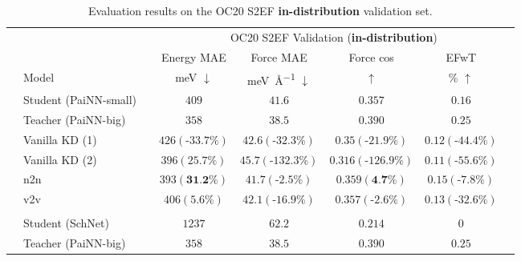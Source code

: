 \documentclass{article}
\begin{document}
\begin{table}[H]
\centering
\caption{Evaluation results on the OC20 S2EF \textbf{in-distribution} validation set.}
\begin{tabular}{llcccccc}
\multicolumn{1}{c}{\multirow{3}{*}{}} & & & \multicolumn{5}{c}{OC20 S2EF Validation (\textbf{in-distribution})} 
\\\cmidrule(r){4-7}
\multicolumn{1}{c}{}   &   &                   &      Energy MAE  &    Force MAE  & Force cos & EFwT \\
&   \multicolumn{1}{l}{Model}     &        &      \si{\milli\electronvolt} $\downarrow$   &    \si{\milli\electronvolt\per\angstrom} $\downarrow$     & $\uparrow$  & \% $\uparrow$ \\\cmidrule(r){1-7}
\parbox[t]{2mm}{} & Student (PaiNN-small)               &   &              $409$      &     $41.6$     &  $0.357$ &  $0.16$  \\
& Teacher (PaiNN-big)              &  &          $358$        &   $38.5$     &   $0.390$      &   $0.25$  \\
& Vanilla KD (1)         &   &            $426 (\text{-}33.7\%)$          &          $42.6 (\text{-}32.3\%)$     &     $0.35 (\text{-}21.9\%)$        &  $0.12 (\text{-}44.4\%)$   \\
& Vanilla KD (2)         &   &                $396 (25.7\%)$      &          $45.7 (\text{-}132.3\%)$     &     $0.316 (\text{-}126.9\%)$        &   $0.11 (\text{-}55.6\%)$ \\
& n2n              &   &             $393 (\textbf{31.2\%})$         &          $41.7 (\text{-}2.5\%)$     &     $0.359 (\textbf{4.7\%})$        & $0.15 (\text{-}7.8\%)$    \\
& v2v                &   &          $406 (5.6\%)$            &          $42.1 (\text{-}16.9\%)$     &     $0.357 (\text{-}2.6\%)$        & $0.13 (\text{-}32.6\%)$    \\
 \\
\parbox[t]{2mm}{} & Student (SchNet)                  &   &              $1237$     &   $62.2$    &  $0.214$  &  $0$   \\
& Teacher (PaiNN-big)              &  &          $358$        &   $38.5$     &   $0.390$      &   $0.25$  \\

\end{tabular}
\end{table}
\end{document}
